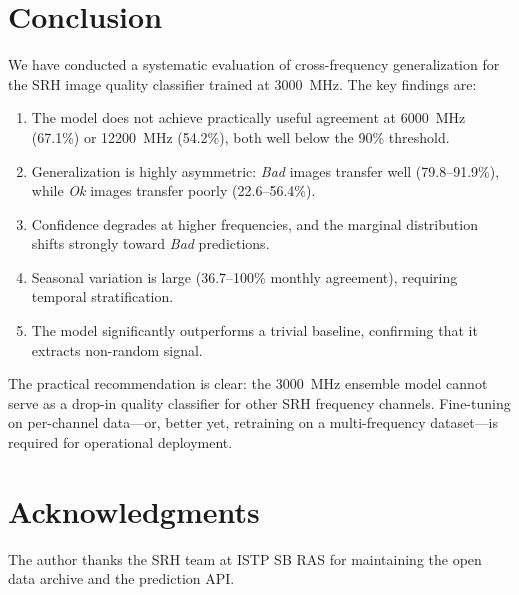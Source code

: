 \documentclass{article}
\theoremstyle{plain}
\theoremstyle{definition}
\begin{document}
\section{Conclusion}
\label{sec:conclusion}

We have conducted a systematic evaluation of cross-frequency
generalization for the SRH image quality classifier trained at
3000~MHz.  The key findings are:

\begin{enumerate}
  \item The model does not achieve practically useful agreement at
    6000~MHz (67.1\%) or 12200~MHz (54.2\%), both well below the
    90\% threshold.
  \item Generalization is highly asymmetric: \emph{Bad} images transfer
    well (79.8--91.9\%), while \emph{Ok} images transfer poorly
    (22.6--56.4\%).
  \item Confidence degrades at higher frequencies, and the marginal
    distribution shifts strongly toward \emph{Bad} predictions.
  \item Seasonal variation is large (36.7--100\% monthly agreement),
    requiring temporal stratification.
  \item The model significantly outperforms a trivial baseline,
    confirming that it extracts non-random signal.
\end{enumerate}

The practical recommendation is clear: the 3000~MHz ensemble model
cannot serve as a drop-in quality classifier for other SRH frequency
channels.  Fine-tuning on per-channel data---or, better yet,
retraining on a multi-frequency dataset---is required for operational
deployment.

\section*{Acknowledgments}

The author thanks the SRH team at ISTP SB RAS for maintaining the open
data archive and the prediction API.



\end{document}
